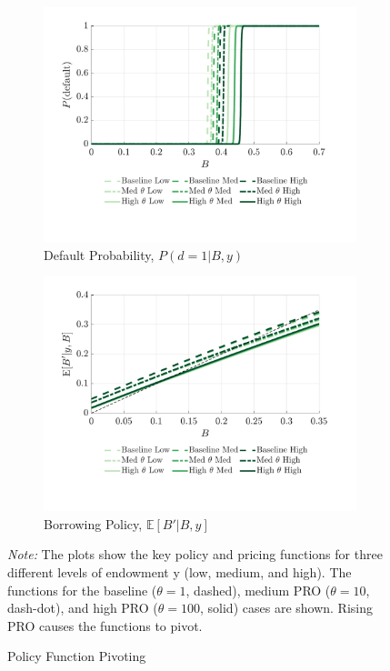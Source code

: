 \documentclass[12pt]{article}
\theoremstyle{plain}
\begin{document}
\begin{figure}[h!]
\begin{subfigure}[b]{0.48\textwidth}
		\centering
		\includegraphics[width=\textwidth]{../../pro-default-model/results/comparison_figure_2.pdf}
		\caption{Default Probability, $P(d=1|B,y)$}
		\label{fig:pivot_default}
	\end{subfigure}
	\hfill
	\begin{subfigure}[b]{0.48\textwidth}
		\centering
		\includegraphics[width=\textwidth]{../../pro-default-model/results/comparison_figure_9.pdf}
		\caption{Borrowing Policy, $\mathbb{E}[B'|B,y]$}
		\label{fig:pivot_borrowing}
	\end{subfigure}
	\caption{Policy Function Pivoting}
	\label{fig:policy_pivot}
	\parbox{\linewidth}{\small\textit{Note:} The plots show the key policy and pricing functions for three different levels of endowment y (low, medium, and high). The functions for the baseline ($\theta=1$, dashed), medium PRO ($\theta=10$, dash-dot), and high PRO ($\theta=100$, solid) cases are shown. Rising PRO causes the functions to pivot.}
\end{figure}
\end{document}
